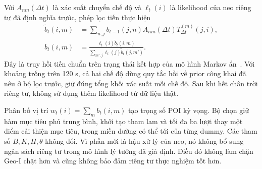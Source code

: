 Với $A_{nm}(\Delta t)$ là xác suất chuyển chế độ và $\ell_t(i)$ là likelihood của neo riêng tư đã định nghĩa trước, phép lọc tiến thực hiện
\begin{align}
 \widetilde b_t(i,m)&=\sum_{n,j}b_{t-1}(j,n)A_{nm}(\Delta t)T^{(m)}_{\Delta t}(j,i),\\
 b_t(i,m)&=\frac{\ell_t(i)\widetilde b_t(i,m)}{\sum_{m',j}\ell_t(j)\widetilde b_t(j,m')}.
\end{align}
Đây là truy hồi tiến chuẩn trên trạng thái kết hợp của mô hình Markov ẩn~\cite{rabiner1989hmm}. Với khoảng trống trên 120 s, cả hai chế độ dùng quy tắc hồi về prior công khai đã nêu ở bộ lọc trước, giữ đúng tổng khối xác suất mỗi chế độ. Sau khi hết chân trời riêng tư, không sử dụng thêm likelihood từ dữ liệu thật.

Phân bố vị trí $w_t(i)=\sum_m b_t(i,m)$ tạo trọng số POI kỳ vọng. Bộ chọn giữ hàm mục tiêu phủ trung bình, khởi tạo tham lam và tối đa ba lượt thay một điểm cải thiện mục tiêu, trong miền đường có thể tới của từng dummy. Các tham số $B,K,H,\theta$ không đổi. Vì phần mới là hậu xử lý của neo, nó không bổ sung ngân sách riêng tư trong mô hình lý tưởng đã giả định. Điều đó không làm chặn Geo-I chặt hơn và cũng không bảo đảm riêng tư thực nghiệm tốt hơn.
